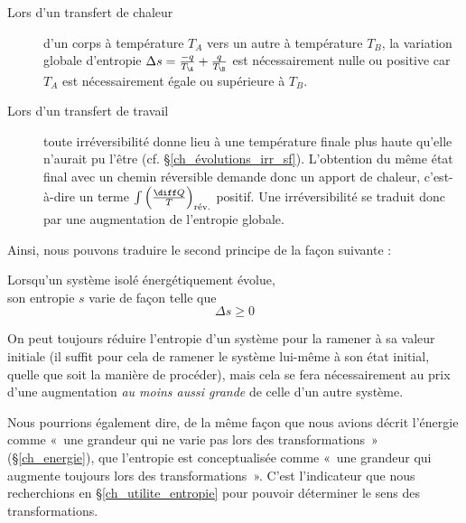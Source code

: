 		\begin{description}	
			\item[Lors d’un transfert de chaleur] d’un corps à température $T_A$ vers un autre à température $T_B$, la variation globale d’entropie $\Delta s = \frac{-q}{T_\A} + \frac{q}{T_\B }$ est nécessairement nulle ou positive car $T_A$ est nécessairement égale ou supérieure à $T_B$.
			
			
			\item[Lors d’un transfert de travail] toute irréversibilité donne lieu à une température finale plus haute qu’elle n’aurait pu l’être (cf. \S\ref{ch_évolutions_irr_sf}). L’obtention du même état final avec un chemin réversible demande donc un apport de chaleur, c’est-à-dire un terme $\int \left(\frac{\diff Q}{T}\right)_\text{rév.}$ positif. Une irréversibilité se traduit donc par une augmentation de l’entropie globale.
			
		\end{description}

		Ainsi, nous pouvons traduire le second principe de la façon suivante :
			
		\begin{trucimportant}
			Lorsqu’un système isolé énergétiquement évolue,\\
			son entropie $s$ varie de façon telle que
				\begin{equation}
					\Delta s \geqslant 0
					\label{eq_augmentation_entropie}
				\end{equation}
		\end{trucimportant}

		On peut toujours réduire l’entropie d’un système pour la ramener à sa valeur initiale (il suffit pour cela de ramener le système lui-même à son état initial, quelle que soit la manière de procéder), mais cela se fera nécessairement au prix d’une augmentation \emph{au moins aussi grande} de celle d’un autre système.
		
		Nous pourrions également dire, de la même façon que nous avions décrit l’énergie comme «~une grandeur qui ne varie pas lors des transformations~» (\S\ref{ch_energie}), que l’entropie est conceptualisée comme «~une grandeur qui augmente toujours lors des transformations~». C’est l’indicateur que nous recherchions en \S\ref{ch_utilite_entropie} pour pouvoir déterminer le sens des transformations.

